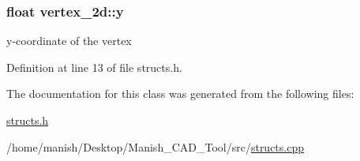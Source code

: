 \subsubsection[{\texorpdfstring{y}{y}}]{\setlength{\rightskip}{0pt plus 5cm}float vertex\+\_\+2d\+::y}\hypertarget{classvertex__2d_a11843935c1197d25dba231bbc767a97a}{}\label{classvertex__2d_a11843935c1197d25dba231bbc767a97a}


y-\/coordinate of the vertex 



Definition at line 13 of file structs.\+h.



The documentation for this class was generated from the following files\+:\begin{DoxyCompactItemize}
\item 
\hyperlink{structs_8h}{structs.\+h}\item 
/home/manish/\+Desktop/\+Manish\+\_\+\+C\+A\+D\+\_\+\+Tool/src/\hyperlink{structs_8cpp}{structs.\+cpp}\end{DoxyCompactItemize}
